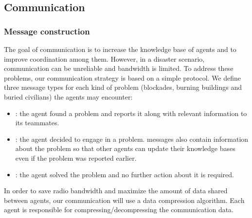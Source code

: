 \subsection{Communication}
\label{sec:communication}

\subsubsection{Message construction}
The goal of communication is to increase the knowledge base of agents and to improve coordination among them. However, in a disaster scenario, communication can be unreliable and bandwidth is limited. To address these problems, our communication strategy is based on a simple protocol. We define three message types for each kind of problem (blockades, burning buildings and buried civilians) the agents may encounter:

\begin{itemize}
 \item {}: the agent found a problem and reports it along with relevant information to its teammates. %

 \item {}: the agent decided to engage in a problem.  messages also contain information about the problem so that other agents can update their knowledge bases even if the problem was reported earlier.

 \item {}: the agent solved the problem and no further action about it is required. %
\end{itemize}


In order to save radio bandwidth and maximize the amount of data shared between agents, our communication will use a data compression algorithm. Each agent is responsible for compressing/decompressing the communication data.

